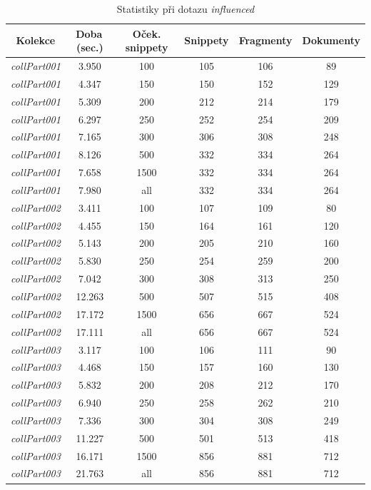 \begin{table}[!ht]
\begin{tabular}{|c|c|c|c|c|c|}
\hline
\textbf{Kolekce} & \textbf{Doba\,(sec.)} & \textbf{Oček. snippety} & \textbf{Snippety} & \textbf{Fragmenty} & \textbf{Dokumenty} \\
\hline
\emph{collPart001} & 3.950 & 100 & 105 & 106 & 89 \\
\hline
\emph{collPart001} & 4.347 & 150 & 150 & 152 & 129 \\
\hline
\emph{collPart001} & 5.309 & 200 & 212 & 214 & 179 \\
\hline
\emph{collPart001} & 6.297 & 250 & 252 & 254 & 209 \\
\hline
\emph{collPart001} & 7.165 & 300 & 306 & 308 & 248 \\
\hline
\emph{collPart001} & 8.126 & 500 & 332 & 334 & 264 \\
\hline
\emph{collPart001} & 7.658 & 1500 & 332 & 334 & 264 \\
\hline
\emph{collPart001} & 7.980 & all & 332 & 334 & 264 \\
\hline\hline
\emph{collPart002} & 3.411 & 100 & 107 & 109 & 80 \\
\hline
\emph{collPart002} & 4.455 & 150 & 164 & 161 & 120 \\
\hline
\emph{collPart002} & 5.143 & 200 & 205 & 210 & 160 \\
\hline
\emph{collPart002} & 5.830 & 250 & 254 & 259 & 200 \\
\hline
\emph{collPart002} & 7.042 & 300 & 308 & 313 & 250 \\
\hline
\emph{collPart002} & 12.263 & 500 & 507 & 515 & 408 \\
\hline
\emph{collPart002} & 17.172 & 1500 & 656 & 667 & 524 \\
\hline
\emph{collPart002} & 17.111 & all & 656 & 667 & 524 \\
\hline\hline
\emph{collPart003} & 3.117 & 100 & 106 & 111 & 90\\
\hline
\emph{collPart003} & 4.468 & 150 & 157 & 160 & 130\\
\hline
\emph{collPart003} & 5.832 & 200 & 208 & 212 & 170\\
\hline
\emph{collPart003} & 6.940 & 250 & 258 & 262 & 210\\
\hline
\emph{collPart003} & 7.336 & 300 & 304 & 308 & 249\\
\hline
\emph{collPart003} & 11.227 & 500 & 501 & 513 & 418 \\
\hline
\emph{collPart003} & 16.171 & 1500 & 856 & 881 & 712 \\
\hline
\emph{collPart003} & 21.763 & all & 856 & 881 & 712 \\
\hline
\end{tabular}
\caption{Statistiky při dotazu \emph{influenced}}
\label{influencedStats}
\end{table}


